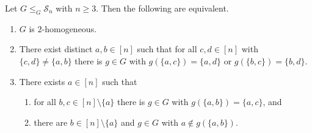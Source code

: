 \begin{proposition} \label{prelim:prop:2homogeneous-pair}
	Let $G \le_G \mathcal S_n$ with $n \ge 3$. Then the following are equivalent.
	\begin{enumerate}
		\item \label{prelim:prop:2homogeneous-pair:1} $G$ is $2$-homogeneous.
		
		\item \label{prelim:prop:2homogeneous-pair:2} There exist distinct $a,b \in [n]$ such
		that for all $c,d \in [n]$ with $\{c,d\} \ne \{a,b\}$ there is $g \in G$ with
		$g(\{a,c\}) = \{a,d\}$ or $g(\{b,c\}) = \{b,d\}$.
				
		\item \label{prelim:prop:2homogeneous-pair:4} There exists $a \in [n]$ such that
		\begin{enumerate}
			\item \label{prelim:prop:2homogeneous-pair:4a} for all
			$b,c \in [n] \setminus \{a\}$ there is $g \in G$ with $g(\{a,b\}) = \{a,c\}$, and
			
			\item \label{prelim:prop:2homogeneous-pair:4b} there are
			$b \in [n] \setminus \{a\}$ and $g \in G$ with $a \notin g(\{a,b\})$.
		\end{enumerate}
	\end{enumerate}
\end{proposition}
